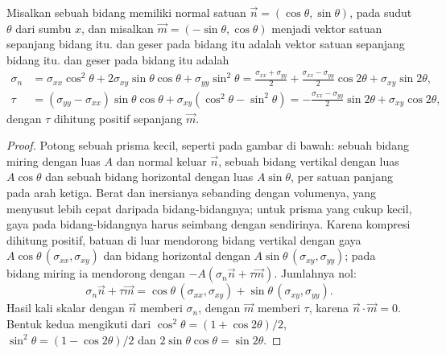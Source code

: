 \begin{proposition}\label{prop:b1:stress-strain-rheology:transformation}
Misalkan sebuah bidang memiliki normal satuan $\vec n = (\cos\theta, \sin\theta)$, pada sudut $\theta$ dari sumbu $x$, dan misalkan $\vec m = (-\sin\theta, \cos\theta)$ menjadi vektor satuan sepanjang bidang itu.  dan geser pada bidang itu
adalah vektor satuan sepanjang bidang itu.  dan geser pada bidang itu adalah
\begin{align*}
  \sigma_n &= \sigma_{xx}\cos^2\theta + 2\sigma_{xy}\sin\theta\cos\theta + \sigma_{yy}\sin^2\theta
           = \frac{\sigma_{xx}+\sigma_{yy}}{2} + \frac{\sigma_{xx}-\sigma_{yy}}{2}\cos2\theta + \sigma_{xy}\sin2\theta, \\
  \tau     &= (\sigma_{yy}-\sigma_{xx})\sin\theta\cos\theta + \sigma_{xy}(\cos^2\theta - \sin^2\theta)
           = -\frac{\sigma_{xx}-\sigma_{yy}}{2}\sin2\theta + \sigma_{xy}\cos2\theta ,
\end{align*}
dengan $\tau$ dihitung positif sepanjang $\vec m$.
\end{proposition}

\begin{proof}
Potong sebuah prisma kecil, seperti pada gambar di bawah: sebuah bidang miring dengan luas $A$ dan normal keluar $\vec n$, sebuah bidang vertikal dengan luas $A\cos\theta$ dan sebuah bidang horizontal dengan luas $A\sin\theta$, per satuan panjang pada arah ketiga. Berat dan inersianya sebanding dengan volumenya, yang menyusut lebih cepat daripada bidang-bidangnya; untuk prisma yang cukup kecil, gaya pada bidang-bidangnya harus seimbang dengan sendirinya. Karena kompresi dihitung positif, batuan di luar mendorong bidang vertikal dengan gaya $A\cos\theta\,(\sigma_{xx}, \sigma_{xy})$ dan bidang horizontal dengan $A\sin\theta\,(\sigma_{xy}, \sigma_{yy})$; pada bidang miring ia mendorong dengan $-A(\sigma_n\vec n + \tau\vec m)$. Jumlahnya nol:
\[
  \sigma_n\vec n + \tau\vec m = \cos\theta\,(\sigma_{xx}, \sigma_{xy}) + \sin\theta\,(\sigma_{xy}, \sigma_{yy}) .
\]
Hasil kali skalar dengan $\vec n$ memberi $\sigma_n$, dengan $\vec m$ memberi $\tau$, karena $\vec n\cdot\vec m = 0$. Bentuk kedua mengikuti dari $\cos^2\theta = (1+\cos2\theta)/2$, $\sin^2\theta = (1-\cos2\theta)/2$ dan $2\sin\theta\cos\theta = \sin2\theta$.
\end{proof}

